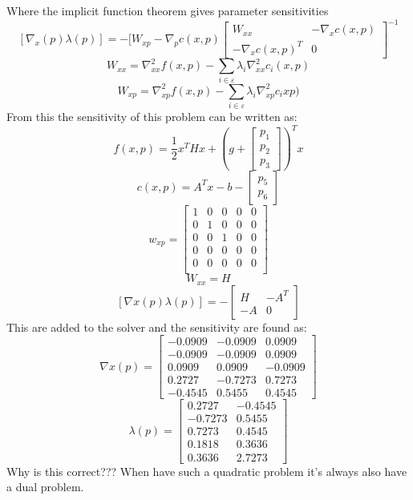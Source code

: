 Where the implicit function theorem gives parameter sensitivities
\[[\nabla_x(p) \lambda(p)]=-[W_{xp} -\nabla_p c(x,p)\begin{bmatrix}
W_{xx} & -\nabla_x c(x,p) \\ -\nabla_x c(x,p)^T & 0
\end{bmatrix}^{-1}\]
\[ W_{xx} = \nabla^2_{xx} f(x,p) - \sum\limits_{i\in\varepsilon} \lambda_i\nabla^2_{xx}c_i(x,p)\]
\[ W_{xp} = \nabla^2_{xp} f(x,p) - \sum\limits_{i\in\varepsilon} \lambda_i\nabla^2_{xp}c_i{xp})\]
From this the sensitivity of this problem can be written as:
\[f(x,p) = \dfrac{1}{2}x^T Hx+(g+\begin{bmatrix} p_1 \\ p_2 \\ p_3 \end{bmatrix})^T x\]
\[c(x,p)=A^Tx-b-\begin{bmatrix} p_5 \\ p_6\end{bmatrix}\]
\[w_{xp}=\begin{bmatrix}
1&0&0&0&0\\0&1&0&0&0\\0&0&1&0&0\\0&0&0&0&0\\0&0&0&0&0\\\end{bmatrix}\]
\[W_{xx}=H\]
\[[\nabla x(p) \lambda(p)]= - \begin{bmatrix}H & -A^T \\-A & 0\end{bmatrix}\]
This are added to the solver and the sensitivity are found as:
\[\nabla x(p)=\begin{bmatrix}
 	-0.0909 &  -0.0909 &  0.0909 \\
   	-0.0909 &  -0.0909 &  0.0909 \\
    0.0909  &   0.0909 & -0.0909 \\
    0.2727  &  -0.7273 &  0.7273 \\
   	-0.4545 &   0.5455 &  0.4545	
\end{bmatrix}\]
\[\lambda(p)=\begin{bmatrix}
	0.2727  & -0.4545 \\
   -0.7273  &  0.5455 \\
    0.7273  &  0.4545 \\
    0.1818  &  0.3636 \\
    0.3636  &  2.7273 
\end{bmatrix}\]
Why is this correct??? 
When have such a quadratic problem it's always also have a dual problem.   